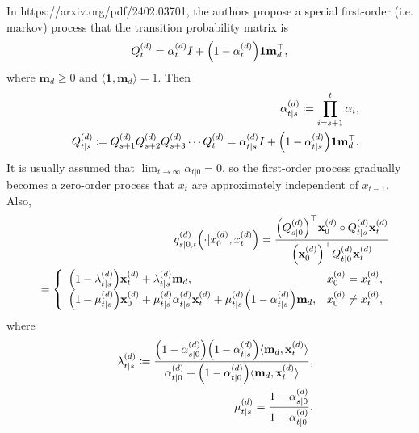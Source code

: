 \documentclass[10pt]{article}
\begin{document}
In https://arxiv.org/pdf/2402.03701, the authors propose a special first-order (i.e. markov) process that the transition probability matrix is
\begin{eqnarray}\label{EqInterpolarQ}
  Q^{(d)}_t = \alpha^{(d)}_t I + \qty(1-\alpha^{(d)}_t)\mathbf{1m}_d^\top,
\end{eqnarray}
where $\mathbf{m}_d\ge 0$ and $\langle\mathbf{1}, \mathbf{m}_d\rangle=1$. Then
\begin{eqnarray*}
  &&\alpha^{(d)}_{t|s}\coloneq \prod_{i=s+1}^t \alpha_i,\\
  &&Q_{t|s}^{(d)}\coloneq Q^{(d)}_{s+1}Q^{(d)}_{s+2}Q^{(d)}_{s+3}\cdots Q^{(d)}_t = \alpha^{(d)}_{t|s} I + \qty(1-\alpha^{(d)}_{t|s})\mathbf{1m}_d^\top.
\end{eqnarray*} 
It is usually assumed that $\lim_{t\to \infty}\alpha_{t|0}=0$, so the first-order process gradually becomes a zero-order process that $x_t$ are approximately independent of $x_{t-1}$. Also,
\begin{eqnarray}\label{EqsOn0tq}
  &&q^{(d)}_{s|0,t}\qty(\cdot|x^{(d)}_0,x^{(d)}_t) = \frac{\qty(Q^{(d)}_{s|0})^\top \mathbf{x}^{(d)}_0\circ Q^{(d)}_{t|s}\mathbf{x}^{(d)}_t}{\qty(\mathbf{x}^{(d)}_0)^\top Q^{(d)}_{t|0}\mathbf{x}^{(d)}_t}\\
  &&=\left\{\begin{array}{ll}
    \qty(1-\lambda^{(d)}_{t|s})\mathbf{x}^{(d)}_t + \lambda^{(d)}_{t|s}\mathbf{m}_d, & x_0^{(d)}=x^{(d)}_t,\\
    \qty(1-\mu^{(d)}_{t|s})\mathbf{x}^{(d)}_0 + \mu^{(d)}_{t|s}\alpha^{(d)}_{t|s}\mathbf{x}^{(d)}_t + \mu^{(d)}_{t|s}\qty(1-\alpha^{(d)}_{t|s})\mathbf{m}_d, & x_0^{(d)}\neq x_t^{(d)},
  \end{array}\right.
\end{eqnarray}
where
\begin{eqnarray*}
  &&\lambda^{(d)}_{t|s}\coloneq\frac{\qty(1-\alpha^{(d)}_{s|0})\qty(1-\alpha^{(d)}_{t|s})\langle \mathbf{m}_d,\mathbf{x}^{(d)}_t\rangle}{\alpha^{(d)}_{t|0} + \qty(1-\alpha^{(d)}_{t|0})\langle \mathbf{m}_d,\mathbf{x}^{(d)}_t\rangle},\\
  &&\mu^{(d)}_{t|s}=\frac{1-\alpha^{(d)}_{s|0}}{1-\alpha^{(d)}_{t|0}}.
\end{eqnarray*}
\end{document}

